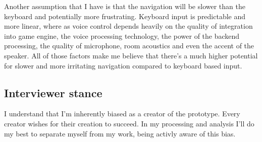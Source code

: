 Another assumption that I have is that the navigation will be slower than the keyboard and potentially more frustrating. Keyboard input is predictable and more linear, where as 
voice control depends heavily on the quality of integration into game engine, the voice processing technology, the power of the backend processing, 
the quality of microphone, room acoustics and even the accent of the speaker. All of those factors make me believe that there's a much higher potential for slower and more irritating
navigation compared to keyboard based input.  
\subsection{Interviewer stance}
I understand that I'm inherently biased as a creator of the prototype. Every creator wishes for their creation to succeed. In my processing and analysis I'll do my best 
to separate myself from my work, being activly aware of this bias. 